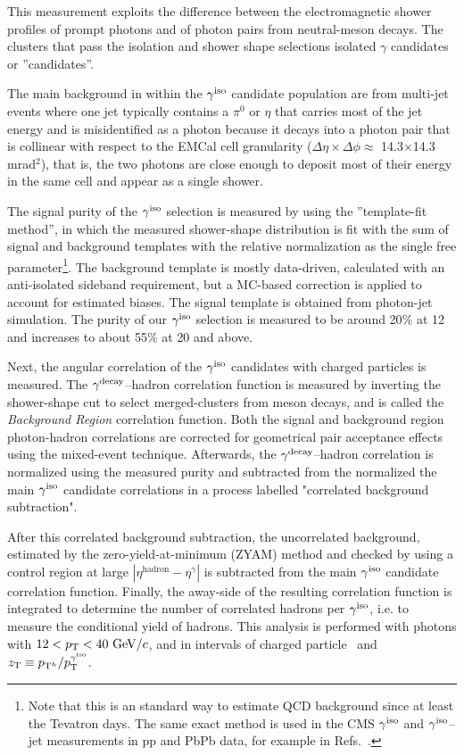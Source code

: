 This measurement exploits the difference between the electromagnetic shower profiles of prompt photons and of photon pairs from neutral-meson decays. The clusters that pass the isolation and shower shape selections isolated $\gamma$ candidates or ''\gammaiso candidates''. 

The main background in within the $\gamma^\mathrm{iso}$ candidate population are from multi-jet events where one jet typically contains a $\pi^{0}$ or $\eta$ that carries most of the jet energy and is misidentified as a photon because it decays into a photon pair that is collinear with respect to the EMCal cell granularity ($\Delta\eta\times\Delta\phi\approx$  14.3$\times$14.3 mrad$^{2}$), that is, the two photons are close enough to deposit most of their energy in the same cell and appear as a single shower. 

The signal purity of the $\gamma^\mathrm{iso}$ selection is measured by using the ''template-fit method'', in which the measured shower-shape distribution is fit with the sum of signal and background templates with the relative normalization as the single free parameter\footnote{Note that this is an standard way to estimate QCD background since at least the Tevatron days. The same exact method is used in the CMS $\gamma^\mathrm{iso}$ and $\gamma^\mathrm{iso}$--jet measurements in pp and PbPb data, for example in Refs.~\cite{Sirunyan:2018gro,Chatrchyan:2012gt}.}. The background template is mostly data-driven, calculated with an anti-isolated sideband requirement, but a MC-based correction is applied to account for estimated biases. The signal template is obtained from photon-jet simulation. The purity of our $\gamma^\mathrm{iso}$ selection is measured to be around 20$\%$ at {12 \GeVc} and increases to about 55$\%$ at {20 \GeVc} and above. 

Next, the angular correlation of the $\gamma^\mathrm{iso}$ candidates with charged particles is measured.  The {$\gamma^\mathrm{decay}$--hadron} correlation function is measured by inverting the shower-shape cut to select merged-clusters from meson decays, and is called the \textit{Background Region} correlation function. Both the signal and background region photon-hadron correlations are corrected for geometrical pair acceptance effects using the mixed-event technique. Afterwards, the $\gamma^\mathrm{decay}$--hadron correlation is normalized using the measured purity and subtracted from the normalized the main $\gamma^\mathrm{iso}$ candidate correlations in a process labelled "correlated background subtraction".

After this correlated background subtraction, the uncorrelated background, estimated by the zero-yield-at-minimum (ZYAM) method and checked by using a control region at large $|\eta^{\mathrm{hadron}}-\eta^{\gamma}|$ is subtracted from the main $\gamma^\mathrm{iso}$ candidate correlation function. Finally, the away-side of the resulting correlation function is integrated to determine the number of correlated hadrons per $\gamma^\mathrm{iso}$, i.e. to measure the conditional yield of hadrons. This analysis is performed with photons with $12<p_{\mathrm{T}} <40~\mathrm{GeV}/c$, and in intervals of charged particle \pt~and $z_{\mathrm{T}} \equiv p_{\mathrm{T}^h}/p_{\mathrm{T}}^{\mathrm{\gamma^\mathrm{iso}}}$. 

